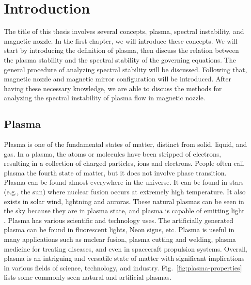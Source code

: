 \chapter{Introduction}
The title of this thesis involves several concepts, plasma, spectral instability, and magnetic nozzle. In the first chapter, we will introduce these concepts. We will start by introducing the definition of plasma, then discuss the relation between the plasma stability and the spectral stability of the governing equations. The general procedure of analyzing spectral stability will be discussed. Following that, magnetic nozzle and magnetic mirror configuration will be introduced. After having these necessary knowledge, we are able to discuss the methods for analyzing the spectral instability of plasma flow in magnetic nozzle.

\section{Plasma}
Plasma is one of the fundamental states of matter, distinct from solid, liquid, and gas. In a plasma, the atoms or molecules have been stripped of electrons, resulting in a collection of charged particles, ions and electrons. People often call plasma the fourth state of matter, but it does not involve phase transition. Plasma can be found almost everywhere in the universe. It can be found in stars (e.g., the sun) where nuclear fusion occurs at extremely high temperature. It also exists in solar wind, lightning and auroras. These natural plasmas can be seen in the sky because they are in plasma state, and plasma is capable of emitting light \cite{chen_introduction_2016}. Plasma has various scientific and technology uses. The artificially generated plasma can be found in fluorescent lights, Neon signs, etc. Plasma is useful in many applications such as nuclear fusion, plasma cutting and welding, plasma medicine for treating diseases, and even in spacecraft propulsion systems. Overall, plasma is an intriguing and versatile state of matter with significant implications in various fields of science, technology, and industry. Fig.~\ref{fig:plasma-properties} lists some commonly seen natural and artificial plasmas.


